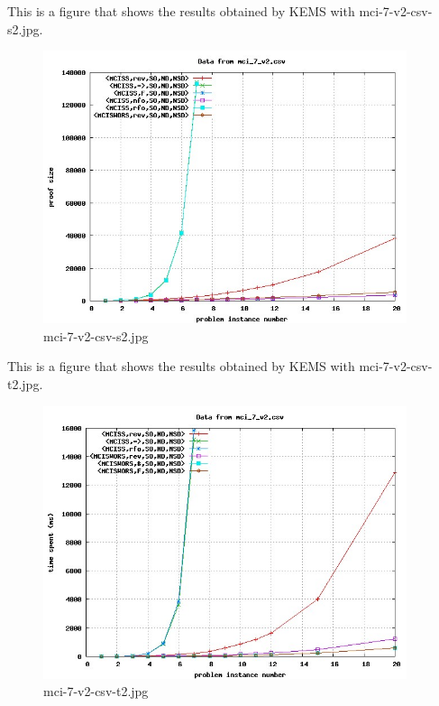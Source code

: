 This is a figure that shows the results obtained by KEMS with mci-7-v2-csv-s2.jpg.
\begin{figure}[htbp]
\begin{center}
\includegraphics[width=0.95\textwidth]{figuras/mci-7-v2-csv-s2.jpg}
\end{center}
\caption{mci-7-v2-csv-s2.jpg}
\end{figure}

This is a figure that shows the results obtained by KEMS with mci-7-v2-csv-t2.jpg.
\begin{figure}[htbp]
\begin{center}
\includegraphics[width=0.95\textwidth]{figuras/mci-7-v2-csv-t2.jpg}
\end{center}
\caption{mci-7-v2-csv-t2.jpg}
\end{figure}

